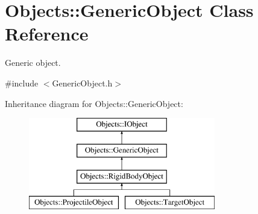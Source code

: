 \hypertarget{class_objects_1_1_generic_object}{\section{Objects\-:\-:Generic\-Object Class Reference}
\label{class_objects_1_1_generic_object}
}


Generic object.  




{\ttfamily \#include $<$Generic\-Object.\-h$>$}

Inheritance diagram for Objects\-:\-:Generic\-Object\-:\begin{figure}[H]
\begin{center}
\leavevmode
\includegraphics[height=4.000000cm]{class_objects_1_1_generic_object}
\end{center}
\end{figure}
